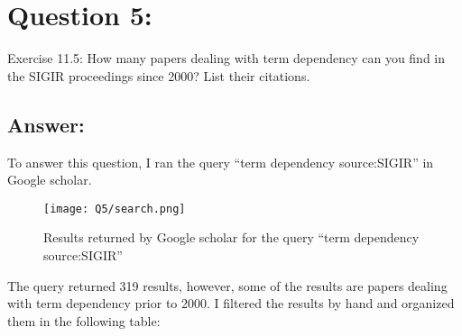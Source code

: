 \section*{Question 5:}
Exercise 11.5:
How many papers dealing with term dependency can you find in the SIGIR proceedings since 2000? List their citations.

\subsection*{Answer:}
To answer this question, I ran the query ``term dependency source:SIGIR'' in Google scholar. 

\begin{figure}[h]
\caption{Results returned by Google scholar for the query ``term dependency source:SIGIR''}
\centering
\texttt{[image: Q5/search.png]}
\end{figure}

The query returned 319 results, however, some of the results are papers dealing with term dependency prior to 2000. I filtered the results by hand and organized them in the following table: